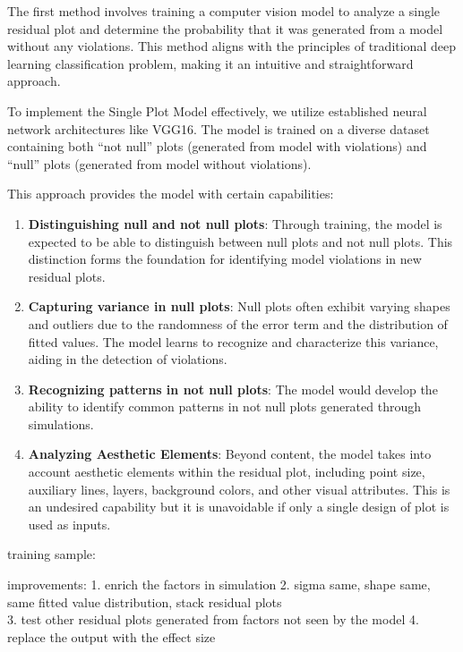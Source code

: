 \documentclass[]{interact}
\theoremstyle{plain}%
\theoremstyle{definition}
\theoremstyle{remark}
\begin{document}
The first method involves training a computer vision model to analyze a
single residual plot and determine the probability that it was generated
from a model without any violations. This method aligns with the
principles of traditional deep learning classification problem, making
it an intuitive and straightforward approach.

To implement the Single Plot Model effectively, we utilize established
neural network architectures like VGG16. The model is trained on a
diverse dataset containing both ``not null'' plots (generated from model
with violations) and ``null'' plots (generated from model without
violations).

This approach provides the model with certain capabilities:

\begin{enumerate}
\def\labelenumi{\arabic{enumi}.}
\item
  \textbf{Distinguishing null and not null plots}: Through training, the
  model is expected to be able to distinguish between null plots and not
  null plots. This distinction forms the foundation for identifying
  model violations in new residual plots.
\item
  \textbf{Capturing variance in null plots}: Null plots often exhibit
  varying shapes and outliers due to the randomness of the error term
  and the distribution of fitted values. The model learns to recognize
  and characterize this variance, aiding in the detection of violations.
\item
  \textbf{Recognizing patterns in not null plots}: The model would
  develop the ability to identify common patterns in not null plots
  generated through simulations.
\item
  \textbf{Analyzing Aesthetic Elements}: Beyond content, the model takes
  into account aesthetic elements within the residual plot, including
  point size, auxiliary lines, layers, background colors, and other
  visual attributes. This is an undesired capability but it is
  unavoidable if only a single design of plot is used as inputs.
\end{enumerate}

training sample:

improvements: 1. enrich the factors in simulation 2. sigma same, shape
same, same fitted value distribution, stack residual plots\\
3. test other residual plots generated from factors not seen by the
model 4. replace the output with the effect size
\end{document}

